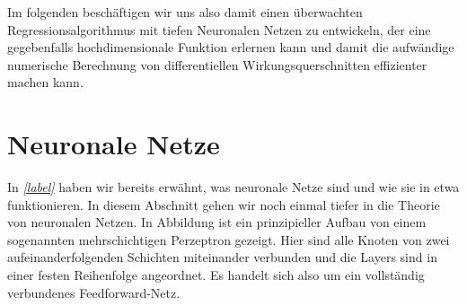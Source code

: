 Im folgenden beschäftigen wir uns also damit einen überwachten Regressionsalgorithmus mit tiefen Neuronalen Netzen zu entwickeln, der eine gegebenfalls hochdimensionale Funktion erlernen kann und damit die aufwändige numerische Berechnung von differentiellen Wirkungsquerschnitten effizienter machen kann.

\section{Neuronale Netze}
In \textit{\autoref{label}} haben wir bereits erwähnt, was neuronale Netze sind und wie sie in etwa funktionieren. In diesem Abschnitt gehen wir noch einmal tiefer in die Theorie von neuronalen Netzen. In Abbildung ist ein prinzipieller Aufbau von einem sogenannten mehrschichtigen Perzeptron gezeigt. Hier sind alle Knoten von zwei aufeinanderfolgenden Schichten miteinander verbunden und die Layers sind in einer festen Reihenfolge angeordnet. Es handelt sich also um ein vollständig verbundenes Feedforward-Netz. 

